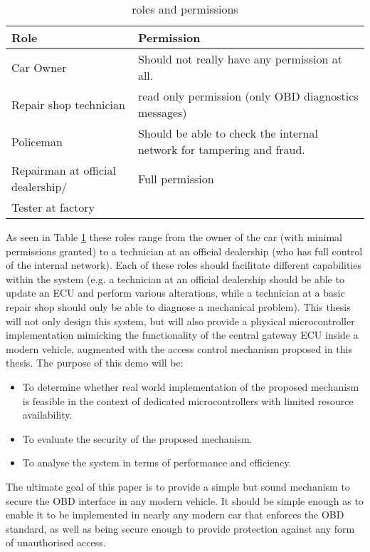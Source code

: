 \documentclass[11pt]{article}
\begin{document}
\begin{table}
	\begin{tabular}{ | l | p{5cm} | }
		\hline
		Role & Permission \\ \hline
		Car Owner & Should not really have any permission at all. \\ \hline
		Repair shop technician & read only permission (only OBD diagnostics messages) \\ \hline
		Policeman & Should be able to check the internal network for tampering and fraud. \\ \hline
		Repairman at official dealership/ & Full permission \\
		Tester at factory \\
		\hline
	\end{tabular}
	\caption{roles and permissions}
	\label{table:roles}
\end{table}

As seen in Table \ref{table:roles} these roles range from the owner of the car (with minimal permissions granted) to a technician at an official dealership (who has full control of the internal network). Each of these roles should facilitate different capabilities within the system (e.g. a technician at an official dealership should be able to update an ECU and perform various alterations, while a technician at a basic repair shop should only be able to diagnose a mechanical problem). \newline
\newline
This thesis will not only design this system, but will also provide a physical microcontroller implementation mimicking the functionality of the central gateway ECU inside a modern vehicle, augmented with the access control mechanism proposed in this thesis. The purpose of this demo will be:

\begin{itemize}
	\item To determine whether real world implementation of the proposed mechanism is feasible in the context of dedicated microcontrollers with limited resource availability.
	\item To evaluate the security of the proposed mechanism.
	\item To analyse the system in terms of performance and efficiency.
\end{itemize}

The ultimate goal of this paper is to provide a simple but sound mechanism to secure the OBD interface in any modern vehicle. It should be simple enough as to enable it to be implemented in nearly any modern car that enforces the OBD standard, as well as being secure enough to provide protection against any form of unauthorised access.
\end{document}
